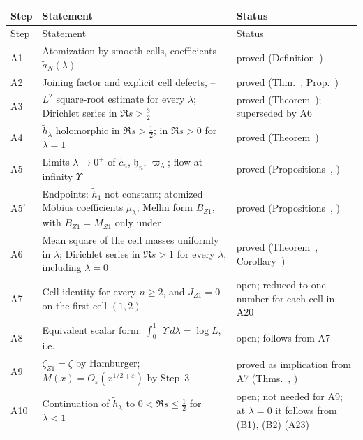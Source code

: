 \documentclass[11pt,reqno]{amsart}
\makeatletter
\let\CG@origref\ref
\let\CG@origeqref\eqref
\newcommand{\CG@gettip}[1]{\@ifundefined{CGTip@#1}{Reference: #1}{\csname CGTip@#1\endcsname}}
\DeclareRobustCommand{\CGref}[1]{\pdftooltip{\CG@origref{#1}}{\CG@gettip{#1}}}
\DeclareRobustCommand{\CGeqref}[1]{\pdftooltip{\CG@origeqref{#1}}{\CG@gettip{#1}}}
\numberwithin{equation}{section}
\theoremstyle{plain}
\theoremstyle{definition}
\theoremstyle{remark}
\newcommand{\eps}{\varepsilon}
\makeatother
\begin{document}
\begingroup\small
\begin{longtable}{p{}p{}p{}}
\toprule
Step & Statement & Status\\
\midrule
\endfirsthead
\toprule
Step & Statement & Status\\
\midrule
\endhead
\bottomrule
\endfoot
A1 & Atomization by smooth cells, coefficients $\tilde a_N(\lambda)$ & proved (Definition~\CGref{def:atomized})\\
A2 & Joining factor and explicit cell defects, \CGeqref{eq:joining-factor}--\CGeqref{eq:cell-explicit-derivative} & proved (Thm.~\CGref{thm:joining-factor}, Prop.~\CGref{prop:cell-explicit})\\
A3 & $L^2$ square-root estimate for every $\lambda$; Dirichlet series in $\Re s>\frac32$ & proved (Theorem~\CGref{thm:atomized-continuation}); superseded by A6\\
A4 & $\tilde h_\lambda$ holomorphic in $\Re s>\frac12$; in $\Re s>0$ for $\lambda=1$ & proved (Theorem~\CGref{thm:atomized-continuation})\\
A5 & Limits $\lambda\to0^+$ of $\tilde c_n$, $\mathfrak h_n$, $\varpi_\lambda$; flow at infinity $\Upsilon$ & proved (Propositions~\CGref{prop:family-flow}, \CGref{prop:cell-limit})\\
A5$'$ & Endpoints: $\tilde h_1$ not constant; atomized M\"obius coefficients $\tilde\mu_\lambda$; Mellin form $B_{Z1}$, with $B_{Z1}=M_{Z1}$ only under \CGeqref{eq:Z1-reciprocal-Dirichlet} & proved (Propositions~\CGref{prop:atomized-clock}, \CGref{prop:Mellin-Mertens})\\
A6 & Mean square of the cell masses uniformly in $\lambda$; Dirichlet series in $\Re s>1$ for every $\lambda$, including $\lambda=0$ & proved (Theorem~\CGref{thm:mean-square-cells}, Corollary~\CGref{cor:abscissa-one})\\
A7 & Cell identity \CGeqref{eq:closing-cells} for every $n\ge2$, and $J_{Z1}=0$ on the first cell $(1,2)$ & open; reduced to one number for each cell in A20\\
A8 & Equivalent scalar form: $\int_{0^+}^1\Upsilon\,d\lambda=\log L$, i.e.\ \CGeqref{eq:product-identity} & open; follows from A7\\
A9 & $\zeta_{Z1}=\zeta$ by Hamburger; $M(x)=O_\eps(x^{1/2+\eps})$ by Step~3 & proved as implication from A7 (Thms.~\CGref{thm:closing}, \CGref{thm:step3})\\
A10 & Continuation of $\tilde h_\lambda$ to $0<\Re s\le\frac12$ for $\lambda<1$ & open; not needed for A9; at $\lambda=0$ it follows from \textup{(B1)}, \textup{(B2)} (A23)\\

\end{longtable}
\end{document}

